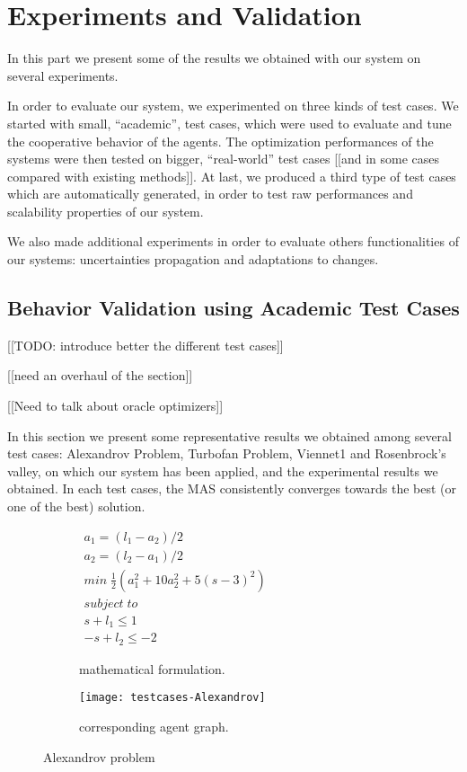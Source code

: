 \part{Experiments and Validation}

In this part we present some of the results we obtained with our system on several experiments.

In order to evaluate our system, we experimented on three kinds of test cases. We started with small, \enquote{academic}, test cases, which were used to evaluate and tune the cooperative behavior of the agents. The optimization performances of the systems were then tested on bigger, \enquote{real-world} test cases [[and in some cases compared with existing methods]]. At last, we produced a third type of test cases which are automatically generated, in order to test raw performances and scalability properties of our system.

We also made additional experiments in order to evaluate others functionalities of our systems: uncertainties propagation and adaptations to changes.

\chapter{Behavior Validation using Academic Test Cases}

[[TODO: introduce better the different test cases]]

[[need an overhaul of the section]]

[[Need to talk about oracle optimizers]]

In this section we present some representative results we obtained among several test cases: Alexandrov Problem, Turbofan Problem, Viennet1 and Rosenbrock's valley, on which our system has been applied, and the experimental results we obtained. In each test cases, the MAS consistently converges towards the best (or one of the best) solution.

\begin{figure}
\centering
	\begin{subfigure}[b]{0.4\textwidth}
		$\begin{array}{c}
			a_1 = (l_1 - a_2)/2 \\
			a_2 = (l_2 - a_1)/2 \\
			min \; \frac{1}{2}(a_1^2 + 10a_2^2 + 5(s-3)^2) \\
			subject \; to \\
			s + l_1 \leq 1 \\
			-s + l_2 \leq -2
		\end{array}$
		\caption{mathematical formulation.}\label{alexandrov:math}
	\end{subfigure}
	\hfill%
	\begin{subfigure}[b]{0.5\textwidth}
		\texttt{[image: testcases-Alexandrov]}%
		\caption{corresponding agent graph.}\label{alexandrov:graph}
	\end{subfigure}
\caption{Alexandrov problem}\label{alexandrov}
\end{figure}

